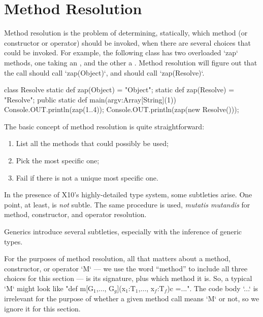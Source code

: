 \section{Method Resolution}
\label{sect:MethodResolution}

Method resolution is the problem of determining, statically, which method (or
constructor or operator)
should be invoked, when there are several choices that could be invoked.  For
example, the following class has two overloaded \xcd`zap` methods, one taking
an , and the other a .  Method resolution will figure
out that the call  should call \xcd`zap(Object)`, and
 should call \xcd`zap(Resolve)`.  

\begin{xten}
class Resolve {
  static def zap(Object) = "Object";
  static def zap(Resolve) = "Resolve";
  public static def main(argv:Array[String](1)) {
    Console.OUT.println(zap(1..4));
    Console.OUT.println(zap(new Resolve()));
  }
}
\end{xten}
%

The basic concept of method resolution is quite straightforward: 
\begin{enumerate}
\item List all the methods that could possibly be used;
\item Pick the most specific one;
\item Fail if there is not a unique most specific one.
\end{enumerate}
\noindent
In the presence of X10's highly-detailed type system, some subtleties arise. 
One point, at least, is {\em not} subtle. The same procedure is used, {\em
mutatis mutandis} for method, constructor, and operator resolution.  

Generics introduce several subtleties, especially with the inference of
generic types. 


For the purposes of method resolution, all that matters about a method,
constructor, or operator \xcd`M` --- we use the word ``method'' to include all
three choices for this section --- is its signature, plus which method it is.
So, a typical \xcd`M` might look like 
\xcdmath"def m[G$_1$,$\ldots$, G$_g$](x$_1$:T$_1$,$\ldots$, x$_f$:T$_f$){c} =...".  The code body \xcd`...` is irrelevant for the purpose of whether a
given method call means \xcd`M` or not, so we ignore it for this section.

